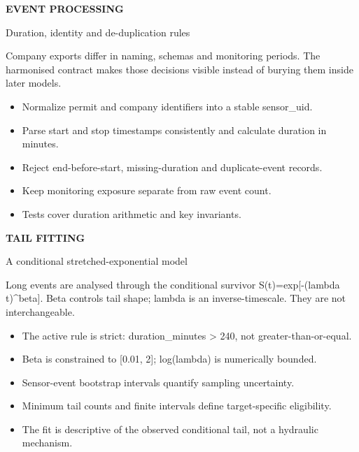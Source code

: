 \documentclass[10pt]{article}
\begin{document}
\clearpage
{\color{teal}\small\bfseries EVENT PROCESSING}\par
{}\par
\small Duration, identity and de-duplication rules\par\vspace{5mm}
Company exports differ in naming, schemas and monitoring periods. The harmonised contract makes those decisions visible instead of burying them inside later models.
\begin{itemize}[leftmargin=5mm]
\item Normalize permit and company identifiers into a stable sensor\_uid.
\item Parse start and stop timestamps consistently and calculate duration in minutes.
\item Reject end-before-start, missing-duration and duplicate-event records.
\item Keep monitoring exposure separate from raw event count.
\item Tests cover duration arithmetic and key invariants.
\end{itemize}
\vfill{}
\clearpage
{\color{teal}\small\bfseries TAIL FITTING}\par
{}\par
\small A conditional stretched-exponential model\par\vspace{5mm}
Long events are analysed through the conditional survivor S(t)=exp[-(lambda t)\textasciicircum{}beta]. Beta controls tail shape; lambda is an inverse-timescale. They are not interchangeable.
\begin{itemize}[leftmargin=5mm]
\item The active rule is strict: duration\_minutes > 240, not greater-than-or-equal.
\item Beta is constrained to [0.01, 2]; log(lambda) is numerically bounded.
\item Sensor-event bootstrap intervals quantify sampling uncertainty.
\item Minimum tail counts and finite intervals define target-specific eligibility.
\item The fit is descriptive of the observed conditional tail, not a hydraulic mechanism.
\end{itemize}
\end{document}
